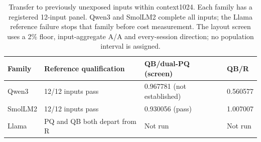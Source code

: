 \begin{table}[t]\centering\small
\caption{Transfer to previously unexposed inputs within context1024. Each family has a registered 12-input panel. Qwen3 and SmolLM2 complete all inputs; the Llama reference failure stops that family before cost measurement. The layout screen uses a 2\% floor, input-aggregate A/A and every-session direction; no population interval is assigned.}
\label{tab:heldouttransfer}
\begin{tabular}{@{}llll@{}}\toprule
Family & Reference qualification & QB/dual-PQ (screen) & QB/R\\\midrule
Qwen3 & 12/12 inputs pass & 0.967781 (not established) & 0.560577\\
SmolLM2 & 12/12 inputs pass & 0.930056 (pass) & 1.007007\\
Llama & PQ and QB both depart from R & Not run & Not run\\
\bottomrule\end{tabular}
\end{table}
